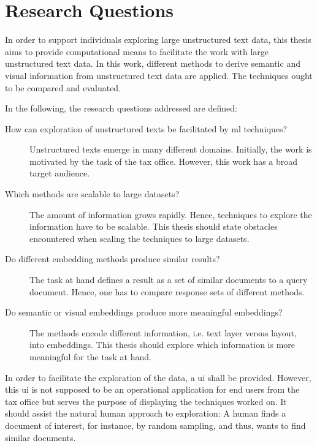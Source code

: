 \section{Research Questions}\label{sec:research-questions}

In order to support individuals exploring large unstructured text data, 
this thesis aims to provide computational means to facilitate the work with large unstructured text data.
In this work, different methods to derive semantic and visual information from unstructured text data are applied.
The techniques ought to be compared and evaluated.

In the following, the research questions addressed are defined:
\begin{description}
    \item[How can exploration of unstructured texts be facilitated by \ac{ml} techniques?]
    Unstructured texts emerge in many different domains.
    Initially, the work is motivated by the task of the tax office.
    However, this work has a broad target audience.

    \item[Which methods are scalable to large datasets?]
    The amount of information grows rapidly.
    Hence, techniques to explore the information have to be scalable.
    This thesis should state obstacles encountered when scaling the techniques to large datasets.

    \item[Do different embedding methods produce similar results?]
    The task at hand defines a result as a set of similar documents to a query document.
    Hence, one has to compare response sets of different methods.

    \item[Do semantic or visual embeddings produce more meaningful embeddings?]
    The methods encode different information, i.e. text layer versus layout, into embeddings. 
    This thesis should explore which information is more meaningful for the task at hand.


\end{description}


In order to facilitate the exploration of the data, a \ac{ui} shall be provided.
However, this \ac{ui} is not supposed to be an operational application for end users from the tax office 
but serves the purpose of displaying the techniques worked on.
It should assist the natural human approach to exploration:
A human finds a document of interest, for instance, by random sampling, and thus, wants to find similar documents.

